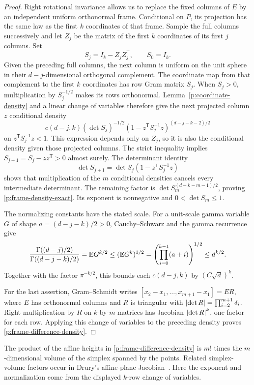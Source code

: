 \begin{proof}
Right rotational invariance allows us to replace the fixed columns of
\(E\) by an independent uniform orthonormal frame. Conditional on \(P\),
its projection has the same law as the first \(k\) coordinates of that
frame. Sample the full columns successively and let \(Z_j\) be the matrix
of the first \(k\) coordinates of its first \(j\) columns. Set
\[
 S_j=I_k-Z_jZ_j^{\mathsf T},\qquad S_0=I_k.
\]
Given the preceding full columns, the next column is uniform on the unit
sphere in their \(d-j\)-dimensional orthogonal complement. The coordinate
map from that complement to the first \(k\) coordinates has row Gram
matrix \(S_j\). When \(S_j>0\), multiplication by \(S_j^{-1/2}\) makes
its rows orthonormal. Lemma~\ref{p:coordinate-density} and a linear change
of variables therefore give the next projected column \(z\) conditional
density
\[
 c(d-j,k)(\det S_j)^{-1/2}
 (1-z^{\mathsf T}S_j^{-1}z)^{(d-j-k-2)/2}
\]
on \(z^{\mathsf T}S_j^{-1}z<1\). This expression depends only on \(Z_j\),
so it is also the conditional density given those projected columns.
The strict inequality implies \(S_{j+1}=S_j-zz^{\mathsf T}>0\)
almost surely. The determinant identity
\[
 \det S_{j+1}=\det S_j(1-z^{\mathsf T}S_j^{-1}z)
\]
shows that multiplication of the \(m\) conditional densities cancels
every intermediate determinant. The remaining factor is
\(\det S_m^{(d-k-m-1)/2}\), proving \eqref{p:frame-density-exact}.
Its exponent is nonnegative and \(0<\det S_m\le1\).

The normalizing constants have the stated scale. For a unit-scale gamma
variable \(G\) of shape \(a=(d-j-k)/2>0\), Cauchy--Schwarz and the gamma
recurrence give
\[
 \frac{\Gamma((d-j)/2)}{\Gamma((d-j-k)/2)}
 =\mathbb E G^{k/2}
 \le(\mathbb E G^k)^{1/2}
 =\left(\prod_{i=0}^{k-1}(a+i)\right)^{1/2}
 \le d^{k/2}.
\]
Together with the factor \(\pi^{-k/2}\), this bounds each \(c(d-j,k)\)
by \((C\sqrt d)^k\).

For the last assertion, Gram--Schmidt writes
\([x_2-x_1,\ldots,x_{m+1}-x_1]=ER\), where \(E\) has orthonormal
columns and \(R\) is triangular with
\(\left\lvert \det R\right\rvert=\prod_{i=2}^{m+1}\delta_i\). Right multiplication by \(R\)
on \(k\)-by-\(m\) matrices has Jacobian \(\left\lvert \det R\right\rvert^k\), one factor
for each row. Applying this change of variables to the preceding density
proves \eqref{p:frame-difference-density}.
\end{proof}

The product of the affine heights in \eqref{p:frame-difference-density}
is \(m!\) times the \(m\)-dimensional volume of the simplex spanned by
the points. Related simplex-volume factors occur in Drury's affine-plane
Jacobian~\cite[Lemma~1, pp.~497--498]{Drury1984}. Here the exponent and
normalization come from the displayed \(k\)-row change of variables.

